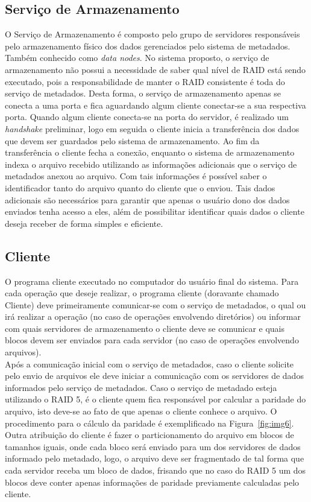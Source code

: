 \subsection{Serviço de Armazenamento}
O Serviço de Armazenamento é composto pelo grupo de servidores responsáveis pelo armazenamento físico dos dados gerenciados pelo sistema de metadados. Também conhecido como \textit{data nodes}. No sistema proposto, o serviço de armazenamento não possui a necessidade de saber qual nível de RAID está sendo executado, pois a responsabilidade de manter o RAID consistente é toda do serviço de metadados. Desta forma, o serviço de armazenamento apenas se conecta a uma porta e fica aguardando algum cliente conectar-se a sua respectiva porta. Quando algum cliente conecta-se na porta do servidor, é realizado um \textit{handshake} preliminar, logo em seguida o cliente inicia a transferência dos dados que devem ser guardados pelo sistema de armazenamento. Ao fim da transferência o cliente fecha a conexão, enquanto o sistema de armazenamento indexa o arquivo recebido utilizando as informações adicionais que o serviço de metadados anexou ao arquivo. Com tais informações é possível saber o identificador tanto do arquivo quanto do cliente que o enviou. Tais dados adicionais são necessários para garantir que apenas o usuário dono dos dados enviados tenha acesso a eles, além de possibilitar identificar quais dados o cliente deseja receber de forma simples e eficiente.
\\

\subsection{Cliente}
O programa cliente executado no computador do usuário final do sistema. Para cada operação que deseje realizar, o programa cliente (doravante chamado Cliente) deve primeiramente comunicar-se com o serviço de metadados, o qual ou irá realizar a operação (no caso de operações envolvendo diretórios) ou informar com quais servidores de armazenamento o cliente deve se comunicar e quais blocos devem ser enviados para cada servidor (no caso de operações envolvendo arquivos).
\\

Após a comunicação inicial com o serviço de metadados, caso o cliente solicite pelo envio de arquivos ele deve iniciar a comunicação com os servidores de dados informados pelo serviço de metadados. Caso o serviço de metadado esteja utilizando o RAID 5, é o cliente quem fica responsável por calcular a paridade do arquivo, isto deve-se ao fato de que apenas o cliente conhece o arquivo. O procedimento para o cálculo da paridade é exemplificado na Figura~\ref{fig:img6}. Outra atribuição do cliente é fazer o particionamento do arquivo em blocos de tamanhos iguais, onde cada bloco será enviado para um dos servidores de dados informado pelo metadado, logo, o arquivo deve ser fragmentado de tal forma que cada servidor receba um bloco de dados, frisando que no caso do RAID 5 um dos blocos deve conter apenas informações de paridade previamente calculadas pelo cliente. 
\\

